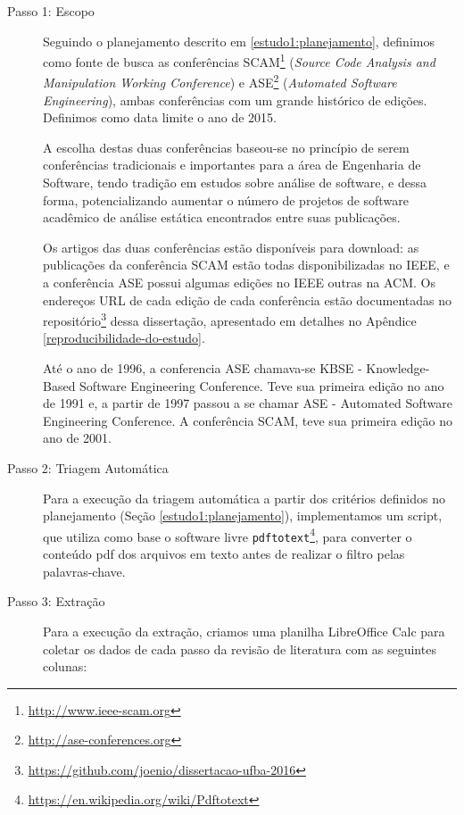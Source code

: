 \begin{description}
  \item [Passo 1: Escopo]

Seguindo o planejamento descrito em \ref{estudo1:planejamento}, definimos como
fonte de busca as conferências SCAM\footnote{\url{http://www.ieee-scam.org}}
({\it Source Code Analysis and Manipulation Working Conference}) e
ASE\footnote{\url{http://ase-conferences.org}} ({\it Automated Software
Engineering}), ambas conferências com um grande histórico de edições. Definimos
como data limite o ano de 2015.

A escolha destas duas conferências baseou-se no princípio de serem conferências
tradicionais e importantes para a área de Engenharia de Software, tendo tradição
em estudos sobre análise de software, e dessa forma, potencializando aumentar
o número de projetos de software acadêmico de análise estática encontrados
entre suas publicações.

Os artigos das duas conferências estão disponíveis para download:
as publicações da conferência SCAM estão todas disponibilizadas no IEEE, e
a conferência ASE possui algumas edições no IEEE outras na ACM. Os endereços URL
de cada edição de cada conferência estão documentadas no
repositório\footnote{\url{https://github.com/joenio/dissertacao-ufba-2016}}
dessa dissertação, apresentado em detalhes no Apêndice
\ref{reproducibilidade-do-estudo}.

Até o ano de 1996, a conferencia ASE chamava-se KBSE - Knowledge-Based Software
Engineering Conference. Teve sua primeira edição no ano de 1991 e, a partir de 1997 
passou a se chamar  ASE - Automated Software Engineering Conference.
A conferência SCAM, teve sua primeira edição no ano de 2001.

  \item [Passo 2: Triagem Automática]

Para a execução da triagem automática a partir dos
critérios definidos no planejamento (Seção \ref{estudo1:planejamento}),
implementamos um script, que utiliza como base o software livre
\texttt{pdftotext}\footnote{\url{https://en.wikipedia.org/wiki/Pdftotext}}, para
converter o conteúdo pdf dos arquivos em texto antes de realizar o filtro pelas
palavras-chave.

  \item [Passo 3: Extração]

Para a execução da extração, criamos uma planilha LibreOffice Calc para coletar os dados de cada passo da
revisão de literatura com as seguintes colunas:


\end{description}
